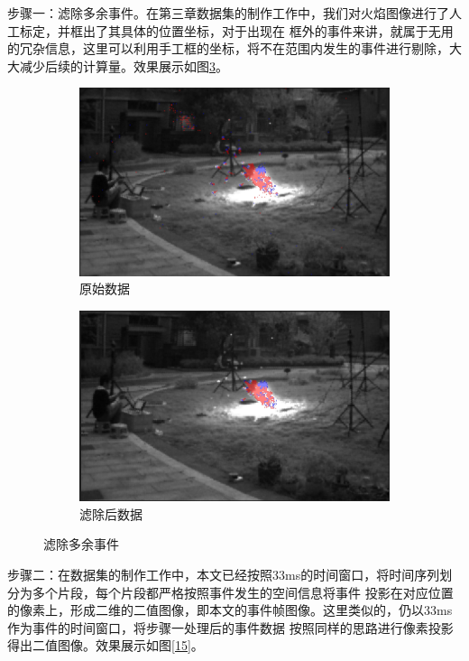 步骤一：滤除多余事件。在第三章数据集的制作工作中，我们对火焰图像进行了人工标定，并框出了其具体的位置坐标，对于出现在
框外的事件来讲，就属于无用的冗杂信息，这里可以利用手工框的坐标，将不在范围内发生的事件进行剔除，大大减少后续的计算量。效果展示如图\ref{14}。
\begin{figure}[ht]
    \centering
    \begin{subfigure}{0.49\textwidth}
        \centering
        \includegraphics[width=\textwidth]{figures/extract_process_01.png}
        \caption{原始数据}
        \label{14.a}
    \end{subfigure}
    \hfill
    \begin{subfigure}{0.49\textwidth}
        \centering
        \includegraphics[width=\textwidth]{figures/extract_process_02.png}
        \caption{滤除后数据}
        \label{14.b}
    \end{subfigure}
    \caption{滤除多余事件}
    \label{14}
\end{figure}

步骤二：在数据集的制作工作中，本文已经按照33ms的时间窗口，将时间序列划分为多个片段，每个片段都严格按照事件发生的空间信息将事件
投影在对应位置的像素上，形成二维的二值图像，即本文的事件帧图像。这里类似的，仍以33ms作为事件的时间窗口，将步骤一处理后的事件数据
按照同样的思路进行像素投影得出二值图像。效果展示如图\ref{15}。

